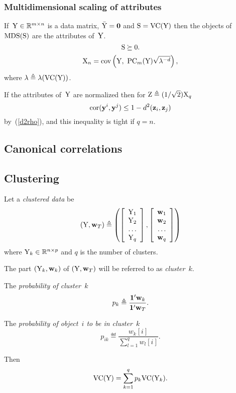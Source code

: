 \documentclass[10pt,a4paper]{article}
\theoremstyle{plain} \newtheorem{Lem}{Lemma}
\begin{document}
\subsubsection{Multidimensional scaling of attributes}

If~$\mathrm Y \in \mathbb R^{m \times n}$ is a data matrix, $\bar {\mathrm Y} = \mathbf 0$ and $\mathrm S = \mathrm {VC} (\mathrm Y)$ 
then the objects of $\mathrm {MDS}(\mathrm S)$ are the attributes of~$\mathrm Y$.
$$ \mathrm S \succeq 0. $$
$$ \mathrm X_n = \mathrm {cov} \left(\mathrm Y, \ \mathrm {PC}_m(\mathrm Y) \sqrt{\mathbf \lambda^{-d}} \right), $$
where $\mathbf \lambda \triangleq \mathbf \lambda(\mathrm {VC}(\mathrm Y))$.

If the attributes of~$\mathrm Y$ are normalized 
then for $\mathrm Z \triangleq (1/\sqrt 2) \mathrm X_q$
$$ \mathrm {cor}(\mathbf y^i, \mathbf y^j) \le 1 - d^2(\mathbf z_i, \mathbf z_j) $$
by~(\ref{d2rho}), 
and this inequality is tight if $q = n$.


\subsection {Canonical correlations}
\comm{}



\subsection{Clustering}

Let a {\em clustered data} be
$$ (\mathrm Y, \mathbf w_T) \triangleq
\left (
\left[ 
\begin{array}{c} 
\mathrm Y_1 \\ 
\mathrm Y_2 \\ 
\dots \\ 
\mathrm Y_q 
\end{array} 
\right],
\left[ 
\begin{array}{c} 
\mathbf w_1 \\ 
\mathbf w_2 \\ 
\dots \\ 
\mathbf w_q 
\end{array} 
\right]
\right)
$$
where $\mathrm Y_k \in \mathbb R^{n \times p}$ and $q$ is the number of clusters.

The part $(\mathrm Y_k,\mathbf w_k)$ of $(\mathrm Y, \mathbf w_T)$ will be referred to as {\em cluster~$k$}.

The {\em probability of cluster~$k$}
$$ p_k \triangleq \frac {\mathbf 1' \mathbf w_k} {\mathbf 1' \mathbf w_T}. $$

The {\em probability of object~$i$ to be in cluster~$k$}
$$ p_{ik} \eqdef \frac {w_k[i]} {\sum_{l=1}^q w_l[i]}. $$

Then
\begin{equation*} 
  \mathrm {VC}(\mathrm Y) = \sum_{k=1}^q p_k \mathrm {VC}(\mathrm Y_k). 
\end{equation*}
\end{document}
